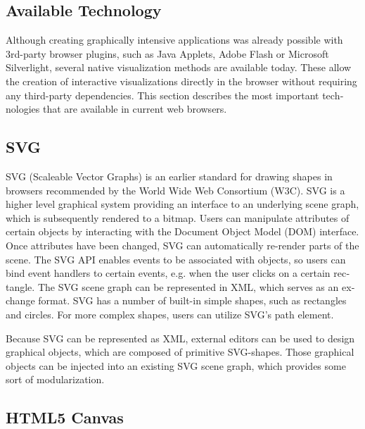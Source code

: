 \begin{english}
\section{Available Technology} %

Although creating graphically intensive applications was already possible with 3rd-party browser plugins, such as Java Applets, Adobe Flash or Microsoft Silverlight, several native visualization methods are available today. These allow the creation of interactive visualizations directly in the browser without requiring any third-party dependencies. This section describes the most important technologies that are available in current web browsers.

\subsection{SVG}

SVG (Scaleable Vector Graphs) is an earlier standard for drawing shapes in browsers recommended by the World Wide Web Consortium (W3C). SVG is a higher level graphical system providing an interface to an underlying scene graph, which is subsequently rendered to a bitmap. Users can manipulate attributes of certain objects by interacting with the Document Object Model (DOM) interface. Once attributes have been changed, SVG can automatically re-render parts of the scene. The SVG API enables events to be associated with objects, so users can bind event handlers to certain events, e.g. when the user clicks on a certain rectangle. The SVG scene graph can be represented in XML, which serves as an exchange format. SVG has a number of built-in simple shapes, such as rectangles and circles. For more complex shapes, users can utilize SVG's path element.

Because SVG can be represented as XML, external editors can be used to design graphical objects, which are composed of primitive SVG-shapes. Those graphical objects can be injected into an existing SVG scene graph, which provides some sort of modularization.

\subsection{HTML5 Canvas}


\end{english}
